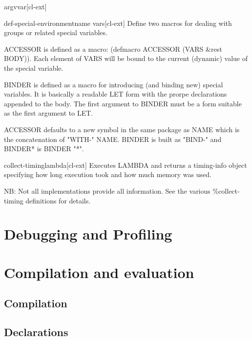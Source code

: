 \documentclass[10pt,english]{book}
\begin{document}
\begin{function}{argv}{var}[cl-ext]
  
\end{function}

\begin{macro}{def-special-environment}{name \key \rest vars}[cl-ext]
  Define two macros for dealing with groups or related special variables.

ACCESSOR is defined as a macro: (defmacro ACCESSOR (VARS \&rest
BODY)).  Each element of VARS will be bound to the
current (dynamic) value of the special variable.

BINDER is defined as a macro for introducing (and binding new)
special variables. It is basically a readable LET form with the
prorpe declarations appended to the body. The first argument to
BINDER must be a form suitable as the first argument to LET.

ACCESSOR defaults to a new symbol in the same package as NAME
which is the concatenation of "WITH-" NAME. BINDER is built as
"BIND-" and BINDER* is BINDER "*".
\end{macro}

\begin{function}{collect-timing}{lambda}[cl-ext]
  Executes LAMBDA and returns a timing-info object specifying
  how long execution took and how much memory was used.

NB: Not all implementations provide all information. See the
various \%collect-timing definitions for details.
\end{function}




\chapter{Debugging and Profiling}




\chapter{Compilation and evaluation}

\section{Compilation}

\section{Declarations}
\end{document}
